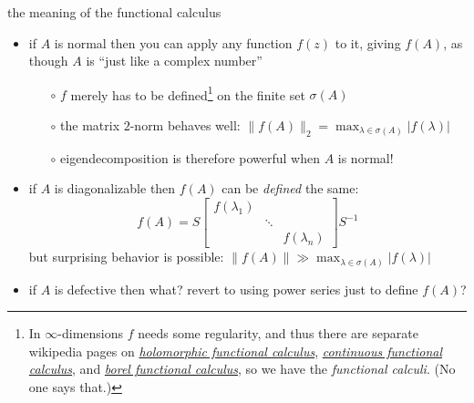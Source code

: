 \documentclass[10pt,hyperref]{beamer}
\begin{document}
\begin{frame}{the meaning of the functional calculus}

\begin{itemize}
\item if $A$ is normal then you can apply any function $f(z)$ to it, giving $f(A)$, as though $A$ is ``just like a complex number''
    \begin{itemize}
    \item[$\circ$] $f$ merely has to be defined\footnote{In $\infty$-dimensions $f$ needs some regularity, and thus there are separate wikipedia pages on \href{https://en.wikipedia.org/wiki/Holomorphic_functional_calculus}{\emph{holomorphic functional calculus}}, \href{https://en.wikipedia.org/wiki/Continuous_functional_calculus}{\emph{continuous functional calculus}}, and \href{https://en.wikipedia.org/wiki/Borel_functional_calculus}{\emph{borel functional calculus}}, so we have the \emph{functional calculi}.  (No one says that.)} on the finite set $\sigma(A)$
    \item[$\circ$] the matrix $2$-norm behaves well: $\|f(A)\|_2 = \max_{\lambda\in\sigma(A)} |f(\lambda)|$
    \item[$\circ$] eigendecomposition is therefore powerful when $A$ is normal!
    \end{itemize}
\item if $A$ is diagonalizable then $f(A)$ can be \emph{defined} the same:
\small
   $$f(A) = S \begin{bmatrix} f(\lambda_1) & & \\ & \ddots & \\ & & f(\lambda_n) \end{bmatrix} S^{-1}$$
\normalsize
but surprising behavior is possible: $\|f(A)\| \gg \max_{\lambda\in\sigma(A)} |f(\lambda)|$
\item if $A$ is defective then what?  revert to using power series just to define $f(A)$?
\end{itemize}
\end{frame}
\end{document}
